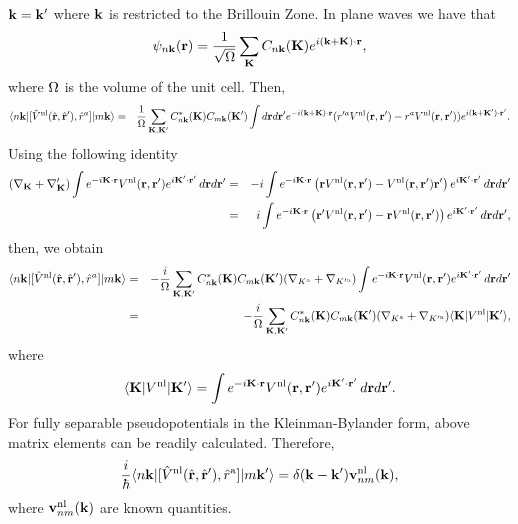 $\mathbf{k}=\mathbf{k}'$ where $\mathbf{k}$ is restricted to the Brillouin Zone.
In plane waves we have that
\begin{eqnarray}\label{cn3}
\psi_{n\mathbf{k}}(\mathbf{r})=\frac{1}{\sqrt{\Omega}}
\sum_{\mathbf{K}} C_{n\mathbf{k}}(\mathbf{K})e^{i(\mathbf{k}+\mathbf{K})\cdot\mathbf{r}}
,
\end{eqnarray}
where $\Omega$ is the volume of the unit cell.
Then,
\begin{eqnarray}\label{cn4}
\langle n\mathbf{k} |[\hat V^{\mathrm{nl}}(\hat{\mathbf{r}},\hat{\mathbf{r}}'),\hat r^a]| m\mathbf{k} \rangle
&=&
\frac{1}{\Omega}
\sum_{\mathbf{K},\mathbf{K}'} 
C^*_{n\mathbf{k}}(\mathbf{K}) 
C_{m\mathbf{k}}(\mathbf{K}')
\int d\mathbf{r} d\mathbf{r}' 
e^{-i(\mathbf{k}+\mathbf{K})\cdot \mathbf{r}}
 ( 
r'^a V^{\mathrm{nl}}(\mathbf{r},\mathbf{r}')
- 
r^aV^{\mathrm{nl}}(\mathbf{r},\mathbf{r}')
) 
e^{i(\mathbf{k}+\mathbf{K}')\cdot \mathbf{r}'}
.
\nonumber\\
\end{eqnarray} 
Using the following identity 
\begin{eqnarray}\label{cn51}
(\nabla_{\mathbf{K}}+\nabla_{\mathbf{K}}')
\int e^{-i\mathbf{K}\cdot\mathbf{r}}
V^{\mathrm{nl}}(\mathbf{r},\mathbf{r}')
e^{i\mathbf{K}'\cdot\mathbf{r}'}
\,d\mathbf{r} d\mathbf{r}'
&=&
-i
\int e^{-i\mathbf{K}\cdot\mathbf{r}}
\left(
\mathbf{r}
V^{\mathrm{nl}}(\mathbf{r},\mathbf{r}')
-
V^{\mathrm{nl}}(\mathbf{r},\mathbf{r}')
\mathbf{r}'
\right)
e^{i\mathbf{K}'\cdot\mathbf{r}'}
\,d\mathbf{r} d\mathbf{r}'
\nonumber\\
&=&
i
\int e^{-i\mathbf{K}\cdot\mathbf{r}}
\left(
\mathbf{r}'
V^{\mathrm{nl}}(\mathbf{r},\mathbf{r}')
-
\mathbf{r}
 V^{\mathrm{nl}}(\mathbf{r},\mathbf{r}')
\right)
e^{i\mathbf{K}'\cdot\mathbf{r}'}
\,d\mathbf{r} d\mathbf{r}'
,
\nonumber\\
\end{eqnarray}
then, we obtain
\begin{eqnarray}\label{cn52}
\langle n\mathbf{k} |[\hat V^{\mathrm{nl}}(\hat{\mathbf{r}},\hat{\mathbf{r}}'),\hat r^a]| m\mathbf{k} \rangle
&=&
-\frac{i}{\Omega}
\sum_{\mathbf{K},\mathbf{K}'}
C^*_{n\mathbf{k}}(\mathbf{K})
C_{m\mathbf{k}}(\mathbf{K}')
(\nabla_{K^{\mathrm{a}}}+\nabla_{K'^{\mathrm{a}}})
\int e^{-i\mathbf{K}\cdot\mathbf{r}}
V^{\mathrm{nl}}(\mathbf{r},\mathbf{r}')
e^{i\mathbf{K}'\cdot\mathbf{r}'}
\,d\mathbf{r} d\mathbf{r}'
\nonumber\\
&=&
-\frac{i}{\Omega}
\sum_{\mathbf{K},\mathbf{K}'}
C^*_{n\mathbf{k}}(\mathbf{K})
C_{m\mathbf{k}}(\mathbf{K}')
(\nabla_{K^{\mathrm{a}}}+\nabla_{K'^{\mathrm{a}}})
\langle \mathbf{K} | 
V^{\mathrm{nl}}
| \mathbf{K}' \rangle 
,
\end{eqnarray}
where
\begin{eqnarray}\label{cn6}
\langle \mathbf{K} | 
V^{\mathrm{nl}}
| \mathbf{K}' \rangle 
=
\int e^{-i\mathbf{K}\cdot\mathbf{r}}
V^{\mathrm{nl}}(\mathbf{r},\mathbf{r}')
e^{i\mathbf{K}'\cdot\mathbf{r}'}
\,d\mathbf{r} d\mathbf{r}'
.
\end{eqnarray}
For fully  separable pseudopotentials in the 
Kleinman-Bylander form,\cite{motta_implementation_2010,kleinman_efficacious_1982,adolph_nonlocality_1996}
above matrix elements 
can be readily calculated.\cite{francesco}
Therefore,
\begin{eqnarray}\label{cn8}
\frac{i}{\hbar}
\langle n\mathbf{k} |[\hat V^{\mathrm{nl}}(\hat{\mathbf{r}},\hat{\mathbf{r}}'),\hat r^{\mathrm{a}}]| m\mathbf{k}' \rangle
=\delta(\mathbf{k}-\mathbf{k}') \mathbf{v}^{\mathrm{nl}}_{nm}(\mathbf{k})
,
\end{eqnarray}
where $\mathbf{v}^{\mathrm{nl}}_{nm}(\mathbf{k})$ are known quantities.


